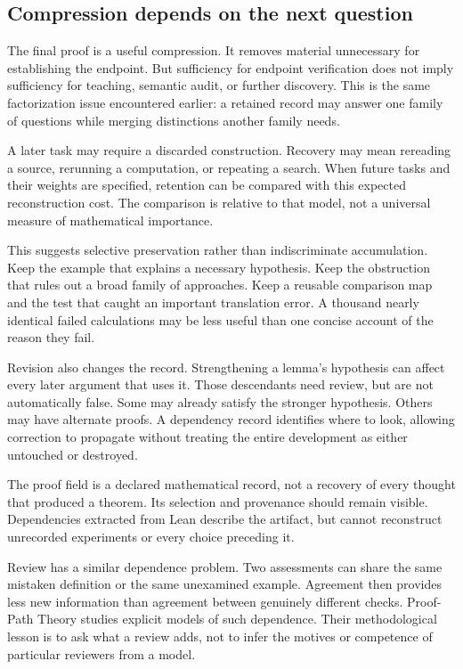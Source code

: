 \subsection{Compression depends on the next question}

The final proof is a useful compression. It removes material unnecessary for establishing the endpoint. But sufficiency for endpoint verification does not imply sufficiency for teaching, semantic audit, or further discovery. This is the same factorization issue encountered earlier: a retained record may answer one family of questions while merging distinctions another family needs.

A later task may require a discarded construction. Recovery may mean rereading a source, rerunning a computation, or repeating a search. When future tasks and their weights are specified, retention can be compared with this expected reconstruction cost. The comparison is relative to that model, not a universal measure of mathematical importance.

This suggests selective preservation rather than indiscriminate accumulation. Keep the example that explains a necessary hypothesis. Keep the obstruction that rules out a broad family of approaches. Keep a reusable comparison map and the test that caught an important translation error. A thousand nearly identical failed calculations may be less useful than one concise account of the reason they fail.

Revision also changes the record. Strengthening a lemma's hypothesis can affect every later argument that uses it. Those descendants need review, but are not automatically false. Some may already satisfy the stronger hypothesis. Others may have alternate proofs. A dependency record identifies where to look, allowing correction to propagate without treating the entire development as either untouched or destroyed.

The proof field is a declared mathematical record, not a recovery of every thought that produced a theorem. Its selection and provenance should remain visible. Dependencies extracted from Lean describe the artifact, but cannot reconstruct unrecorded experiments or every choice preceding it.

Review has a similar dependence problem. Two assessments can share the same mistaken definition or the same unexamined example. Agreement then provides less new information than agreement between genuinely different checks. Proof-Path Theory studies explicit models of such dependence. Their methodological lesson is to ask what a review adds, not to infer the motives or competence of particular reviewers from a model.

